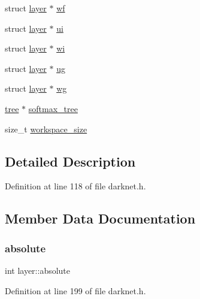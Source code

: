 \begin{DoxyCompactItemize}
\item 
struct \mbox{\hyperlink{structlayer}{layer}} $\ast$ \mbox{\hyperlink{structlayer_a02dc5b80b7e15c4b4bd9d968ffbde662}{wf}}
\item 
struct \mbox{\hyperlink{structlayer}{layer}} $\ast$ \mbox{\hyperlink{structlayer_ab1c06528fcb7f3a3ffedfc89db86d109}{ui}}
\item 
struct \mbox{\hyperlink{structlayer}{layer}} $\ast$ \mbox{\hyperlink{structlayer_aea3b1b349201ba0f9234d978e2b249a8}{wi}}
\item 
struct \mbox{\hyperlink{structlayer}{layer}} $\ast$ \mbox{\hyperlink{structlayer_ad1a598647343ef1b791891b186dc9186}{ug}}
\item 
struct \mbox{\hyperlink{structlayer}{layer}} $\ast$ \mbox{\hyperlink{structlayer_ae2aa4b3552e0fd33370d332c3b318066}{wg}}
\item 
\mbox{\hyperlink{structtree}{tree}} $\ast$ \mbox{\hyperlink{structlayer_ada8540db939d29074a5764ac9ba92f57}{softmax\+\_\+tree}}
\item 
size\+\_\+t \mbox{\hyperlink{structlayer_afeb9d7fb2a202ef5387c135fbade83da}{workspace\+\_\+size}}
\end{DoxyCompactItemize}


\subsection{Detailed Description}


Definition at line 118 of file darknet.\+h.



\subsection{Member Data Documentation}
\mbox{\label{structlayer_afe0cd75c5d7d210ec413df79b73aa40a}} 
\subsubsection{\texorpdfstring{absolute}{absolute}}
{\footnotesize\ttfamily int layer\+::absolute}



Definition at line 199 of file darknet.\+h.

\mbox{\label{structlayer_af7e837568a9975545159025b2fdbf31a}} 
